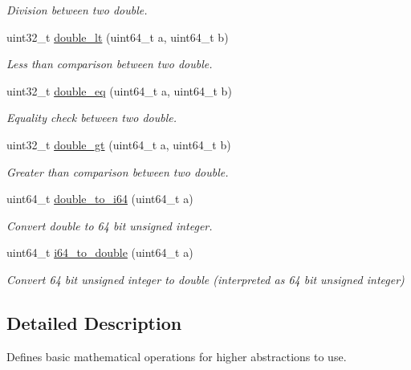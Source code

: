 \begin{DoxyCompactItemize}
\begin{DoxyCompactList}\small\item\em Division between two double. \end{DoxyCompactList}\item 
uint32\+\_\+t \mbox{\hyperlink{group__mathcapi_ga68d359e670da751723bf3d78ff759614}{double\+\_\+lt}} (uint64\+\_\+t a, uint64\+\_\+t b)
\begin{DoxyCompactList}\small\item\em Less than comparison between two double. \end{DoxyCompactList}\item 
uint32\+\_\+t \mbox{\hyperlink{group__mathcapi_ga8911bd5a24e0d8287d6b3d5a81500e6a}{double\+\_\+eq}} (uint64\+\_\+t a, uint64\+\_\+t b)
\begin{DoxyCompactList}\small\item\em Equality check between two double. \end{DoxyCompactList}\item 
uint32\+\_\+t \mbox{\hyperlink{group__mathcapi_gab60e3f0c6651ad497f6665e032e39f6a}{double\+\_\+gt}} (uint64\+\_\+t a, uint64\+\_\+t b)
\begin{DoxyCompactList}\small\item\em Greater than comparison between two double. \end{DoxyCompactList}\item 
uint64\+\_\+t \mbox{\hyperlink{group__mathcapi_ga1388e46084036133e57508c18590b1ed}{double\+\_\+to\+\_\+i64}} (uint64\+\_\+t a)
\begin{DoxyCompactList}\small\item\em Convert double to 64 bit unsigned integer. \end{DoxyCompactList}\item 
uint64\+\_\+t \mbox{\hyperlink{group__mathcapi_gaec506d4ee77526e67ab5f2a8ef54f2b5}{i64\+\_\+to\+\_\+double}} (uint64\+\_\+t a)
\begin{DoxyCompactList}\small\item\em Convert 64 bit unsigned integer to double (interpreted as 64 bit unsigned integer) \end{DoxyCompactList}\end{DoxyCompactItemize}


\subsection{Detailed Description}
Defines basic mathematical operations for higher abstractions to use. 



